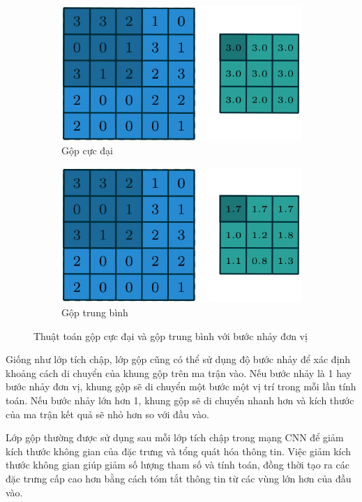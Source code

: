 \begin{figure}[h]
	\centering
	\begin{subfigure}{.4\textwidth}
		\centering
		\includegraphics[width=.9\linewidth]{images/max-pooling}
		\caption{Gộp cực đại}
		\label{fig:max-pooling}
	\end{subfigure}

	\begin{subfigure}{.4\textwidth}
		\centering
		\includegraphics[width=.9\linewidth]{images/avg-pooling}
		\caption{Gộp trung bình}
		\label{fig:avg-pooling}
	\end{subfigure} %
	\caption{Thuật toán gộp cực đại và gộp trung bình với bước nhảy đơn vị}
\end{figure}

Giống như lớp tích chập, lớp gộp cũng có thể sử dụng độ bước nhảy để xác định khoảng cách di chuyển của khung gộp trên ma trận vào. Nếu bước nhảy là 1 hay bước nhảy đơn vị, khung gộp sẽ di chuyển một bước một vị trí trong mỗi lần tính toán. Nếu bước nhảy lớn hơn 1, khung gộp sẽ di chuyển nhanh hơn và kích thước của ma trận kết quả sẽ nhỏ hơn so với đầu vào.

Lớp gộp thường được sử dụng sau mỗi lớp tích chập trong mạng CNN để giảm kích thước không gian của đặc trưng và tổng quát hóa thông tin. Việc giảm kích thước không gian giúp giảm số lượng tham số và tính toán, đồng thời tạo ra các đặc trưng cấp cao hơn bằng cách tóm tắt thông tin từ các vùng lớn hơn của đầu vào.

